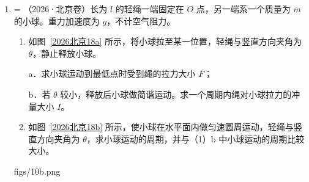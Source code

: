\documentclass[\gkver]{gaokaozhenti}
\makeatletter
\newcommand{\tiinfo}[2]{{\small\color{gray}（#1）\textcolor{orange!85!black}{\nandu{#2}}}\hspace{0.4em}}
\newenvironment{tibody}
  {\begin{minipage}[t]{\linewidth}\@listdepth=\@ne\leavevmode\ignorespaces}
  {\end{minipage}}
\makeatother
\begin{document}
\begin{enumerate}[resume=tiku]
{解得 $t = 0.6\Us$；则排球在空中飞行的水平距离

$x = v_{0}t = 4.8\Um$

（2）乙同学垫起排球前瞬间排球在竖直方向速度的大小

$v_{y} = gt = 10 \times 0.6\Ums = 6\Ums$

根据 $v = \sqrt{v_{0}^{2} + v_{y}^{2}}$

得 $v = 10.0\Ums$；设速度方向与水平方向夹角为 $\theta$（如答图所示）


则有 $\tan\theta = \frac{v_{y}}{v_{0}} = 0.75$

（3）根据动量定理，排球与乙同学作用过程中所受冲量的大小 $I = 2mv = 6.0\UNs$
}

\item
\begin{tibody}
\tiinfo{2026·北京卷}{2}长为 $l$ 的轻绳一端固定在 $O$ 点，另一端系一个质量为 $m$ 的小球。重力加速度为 $g$，不计空气阻力。
\begin{enumerate}
	\item
	如图~\ref{2026北京18a} 所示，将小球拉至某一位置，轻绳与竖直方向夹角为 $\theta$，静止释放小球。

	a．求小球运动到最低点时受到绳的拉力大小 $F$；

	b．若 $\theta$ 较小，释放后小球做简谐运动。求一个周期内绳对小球拉力的冲量大小 $I$。
	\item
	如图~\ref{2026北京18b} 所示，使小球在水平面内做匀速圆周运动，轻绳与竖直方向夹角为 $\theta$，求小球运动的周期，并与（1）b 中小球运动的周期比较大小。
\end{enumerate}
{figs/10b.png}
\end{tibody}

\end{enumerate}
\end{document}

